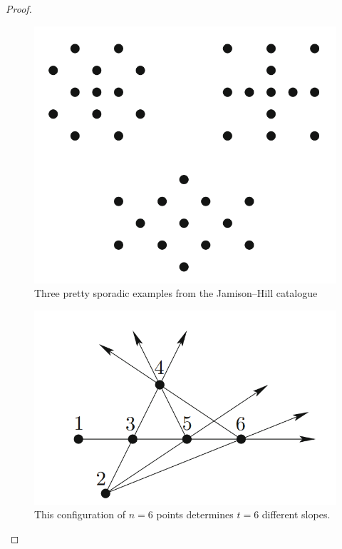 \documentclass[a4paper]{article}
\begin{document}
\begin{proof}
\begin{figure}[H]
    \centering
    \includegraphics[scale=0.4]{pics/picture2.png}
    \caption{Three pretty sporadic examples from the Jamison–Hill catalogue}
\end{figure}

\begin{figure}[H]
    \centering
    \includegraphics[scale=0.4]{pics/picture3.png}
    \caption{This configuration of $n = 6$ points determines $t = 6$ different slopes.}
\end{figure}


\end{proof}
\end{document}
